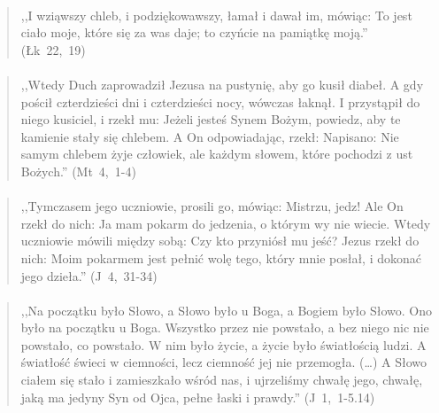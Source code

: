 \documentclass[10pt,a4paper,oneside]{article}
\begin{document}
\paragraph{}
\begin{quote}
,,I wziąwszy chleb, i podziękowawszy, łamał i dawał im, mówiąc: To jest ciało moje, które się za was daje; to czyńcie na pamiątkę moją.'' \mbox{(Łk 22, 19)}
\end{quote}
\paragraph{}
\begin{quote}
,,Wtedy Duch zaprowadził Jezusa na pustynię, aby go kusił diabeł. A gdy pościł czterdzieści dni i czterdzieści nocy, wówczas łaknął. I przystąpił do niego kusiciel, i rzekł mu: Jeżeli jesteś Synem Bożym, powiedz, aby te kamienie stały się chlebem. A On odpowiadając, rzekł: Napisano: Nie samym chlebem żyje człowiek, ale każdym słowem, które pochodzi z ust Bożych.'' \mbox{(Mt 4, 1-4)}
\end{quote}
\paragraph{}
\begin{quote}
,,Tymczasem jego uczniowie, prosili go, mówiąc: Mistrzu, jedz! Ale On rzekł do nich: Ja mam pokarm do jedzenia, o którym wy nie wiecie. Wtedy uczniowie mówili między sobą: Czy kto przyniósł mu jeść? Jezus rzekł do nich: Moim pokarmem jest pełnić wolę tego, który mnie posłał, i dokonać jego dzieła.'' \mbox{(J 4, 31-34)}
\end{quote}
\paragraph{}
\begin{quote}
,,Na początku było Słowo, a Słowo było u Boga, a Bogiem było Słowo. Ono było na początku u Boga. Wszystko przez nie powstało, a bez niego nic nie powstało, co powstało. W nim było życie, a życie było światłością ludzi. A światłość świeci w ciemności, lecz ciemność jej nie przemogła. (\ldots) A Słowo ciałem się stało i zamieszkało wśród nas, i ujrzeliśmy chwałę jego, chwałę, jaką ma jedyny Syn od Ojca, pełne łaski i prawdy.'' \mbox{(J 1, 1-5.14)}
\end{quote}
\end{document}

